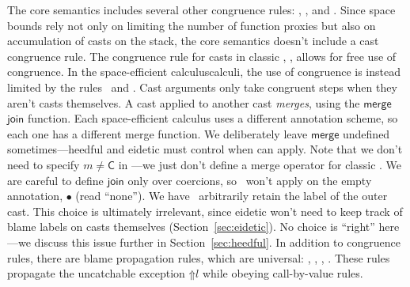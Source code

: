 \documentclass[9pt]{extarticle}
\newcommand{\ottnt}[1]{\mathit{#1}}
\begin{document}
The core semantics includes several other congruence rules: ,
, and .
Since space bounds rely not only on limiting the number of function
proxies but also on accumulation of casts on the stack, the core
semantics doesn't include a cast congruence rule. The congruence rule
for casts in classic \lambdah, , allows for free use of
congruence. In the space-efficient \ifpopl{}calculus\else{}calculi\fi, the use of congruence is
instead limited by the rules \ECastInner\ and \ECastMerge. Cast
arguments only take congruent steps when they aren't casts
themselves. A cast applied to another cast \textit{merges}, using the
\iffull $ \mathsf{merge} $ \else $ \mathsf{join} $ \fi function.
Each space-efficient calculus uses a different annotation scheme, so
each one has a different merge function. \iffull We deliberately leave
$ \mathsf{merge} $ undefined sometimes---heedful and eidetic \lambdah must
control when  can apply.
Note that we don't need to specify $\ottnt{m}  \neq   \mathsf{C} $ in \ECastMerge---we
just don't define a merge operator for classic \lambdah.  \else We are
careful to define $ \mathsf{join} $ only over coercions, so \ECastMerge\ won't
apply on the empty annotation, $ \bullet $ (read ``none''). \fi
We have \ECastMerge\ arbitrarily retain the label of the outer
cast. \ifpopl This choice is ultimately irrelevant, since eidetic
\lambdah won't need to keep track of blame labels on casts themselves
(Section~\ref{sec:eidetic}). \else No choice is ``right'' here---we
discuss this issue further in Section~\ref{sec:heedful}. \fi
In addition to congruence rules, there are blame propagation rules,
which are universal: , , ,
. These rules propagate the uncatchable exception
$ \mathord{\Uparrow}  \ottnt{l} $ while obeying call-by-value rules.
\end{document}
